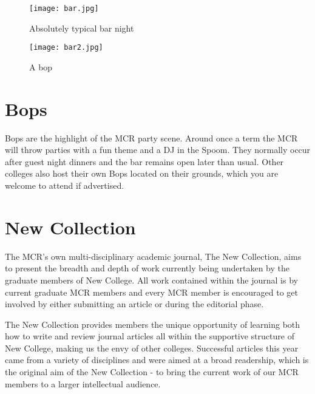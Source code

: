 \begin{figure}[htbp]
\centering
		\begin{minipage}{0.45\textwidth}
				\centering
				\texttt{[image: bar.jpg]}
				\caption[]{Absolutely typical bar night}
				\label{fig:bar}
        \end{minipage}%
        \quad
        \begin{minipage}{0.45\textwidth}
				\centering
				\texttt{[image: bar2.jpg]}
				\caption[]{A bop}
				\label{fig:bop}
        \end{minipage}%
\end{figure}

\section{Bops}
Bops are the highlight of the MCR party scene. Around once a term the MCR will
throw parties with a fun theme and a DJ in the Spoom. They normally occur after guest night dinners and the bar remains open later than usual. Other colleges also host their own Bops located on their grounds, which you are welcome to attend if advertised. 

\section{New Collection}
The MCR's own multi-disciplinary academic journal, The New Collection, aims to present the breadth and depth of work currently being undertaken by the graduate members of New College. All work contained within the journal is by current graduate MCR members and every MCR member is encouraged to get involved by either submitting an article or during the editorial phase.

The New Collection provides members the unique opportunity of learning both how to write and review journal articles all within the supportive structure of New College, making us the envy of other colleges. Successful articles this year came from a variety of disciplines and were aimed at a broad readership, which is the original aim of the New Collection - to bring the current work of our MCR members to a larger intellectual audience.


